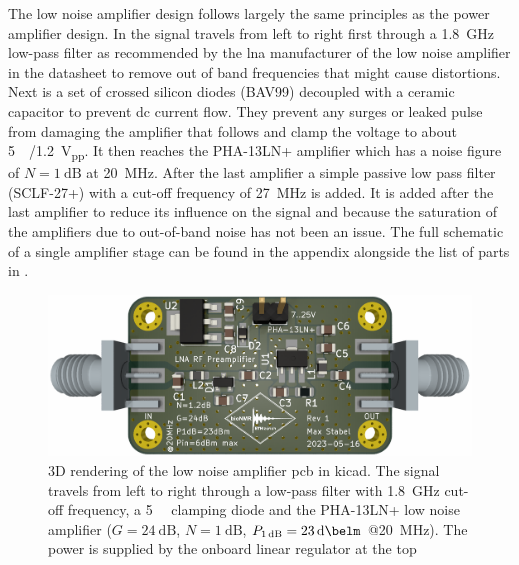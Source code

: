 The low noise amplifier design follows largely the same principles as the power amplifier design. In  the signal travels from left to right first through a \qty{1.8}{\giga\hertz} low-pass filter as recommended by the \acrshort{lna} manufacturer of the low noise amplifier in the datasheet to remove out of band frequencies that might cause distortions. Next is a set of crossed silicon diodes (BAV99) decoupled with a ceramic capacitor to prevent \acrshort{dc} current flow. They prevent any surges or leaked pulse from damaging the amplifier that follows and clamp the voltage to about \qty{+5}{\deci\belm}/\qty{1.2}{V_{pp}}. It then reaches the PHA-13LN+ amplifier which has a noise figure of \(N = \qty{1}{\deci\bel}\) at \qty{20}{\mega\hertz}. After the last amplifier a simple passive low pass filter (SCLF-27+) with a cut-off frequency of \qty{27}{\mega\hertz} is added. It is added after the last amplifier to reduce its influence on the signal and because the saturation of the amplifiers due to out-of-band noise has not been an issue. The full schematic of a single amplifier stage can be found in the appendix  alongside the list of parts in .

\begin{figure}[hbt]
    \centering
    \includegraphics[width=\textwidth]{images/preamp.png}
    \caption{ 3D rendering of the low noise amplifier \acrshort{pcb} in \gls{kicad}. The signal travels from left to right through a low-pass filter with \qty{1.8}{\giga\hertz} cut-off frequency, a \qty{+5}{\deci\belm} clamping diode and the PHA-13LN+ low noise amplifier (\(G = \qty{24}{\deci\bel}\), \(N = \qty{1}{\deci\bel}\), \(P_{\qty{1}{\deci\bel}} = \qty{23}{\deci\belm}\) @\qty{20}{\mega\hertz}). The power is supplied by the onboard linear regulator at the top}
\end{figure}

